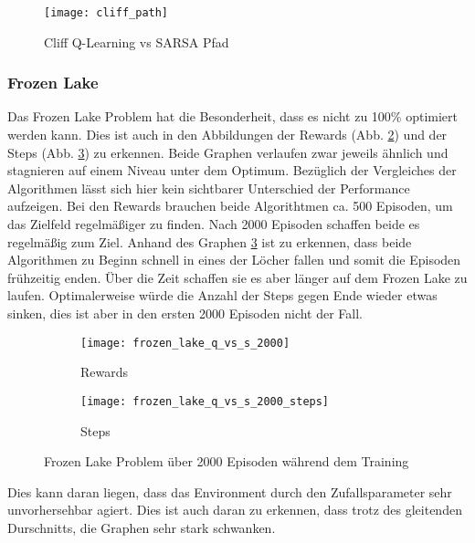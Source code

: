 \begin{figure}[H]
    \texttt{[image: cliff\_path]}
    \caption{Cliff Q-Learning vs SARSA Pfad}
    \label{fig:cliff_path}
\end{figure}

\subsubsection{Frozen Lake}

Das Frozen Lake Problem hat die Besonderheit, dass es nicht zu 100\% optimiert werden kann. Dies ist auch in den Abbildungen der Rewards (Abb. \ref{fig:frozen_rew}) und der Steps (Abb. \ref{fig:frozen_step}) zu erkennen. Beide Graphen verlaufen zwar jeweils ähnlich und stagnieren auf einem Niveau unter dem Optimum. Bezüglich der Vergleiches der Algorithmen lässt sich hier kein sichtbarer Unterschied der Performance aufzeigen. Bei den Rewards brauchen beide Algorithtmen ca. 500 Episoden, um das Zielfeld regelmäßiger zu finden. Nach 2000 Episoden schaffen beide es regelmäßig zum Ziel. 
Anhand des Graphen \ref{fig:frozen_step} ist zu erkennen, dass beide Algorithmen zu Beginn schnell in eines der Löcher fallen und somit die Episoden frühzeitig enden. Über die Zeit schaffen sie es aber länger auf dem Frozen Lake zu laufen. Optimalerweise würde die Anzahl der Steps gegen Ende wieder etwas sinken, dies ist aber in den ersten 2000 Episoden nicht der Fall.


\begin{figure}[H]
    \centering
    \begin{subfigure}{.5\textwidth}
      \centering
      \texttt{[image: frozen\_lake\_q\_vs\_s\_2000]}
      \caption{Rewards}
      \label{fig:frozen_rew}
    \end{subfigure}%
    \begin{subfigure}{.5\textwidth}
      \centering
      \texttt{[image: frozen\_lake\_q\_vs\_s\_2000\_steps]}
      \caption{Steps}
      \label{fig:frozen_step}
    \end{subfigure}
    \caption{Frozen Lake Problem über 2000 Episoden während dem Training}
    \label{fig:frozen_train}
\end{figure}

Dies kann daran liegen, dass das Environment durch den Zufallsparameter sehr unvorhersehbar agiert. Dies ist auch daran zu erkennen, dass trotz des gleitenden Durschnitts, die Graphen sehr stark schwanken.

